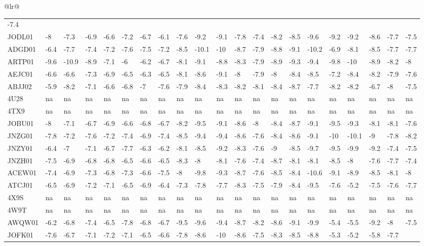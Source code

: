 \documentclass[12pt,twoside]{reedthesis}
\begin{document}
\begin{longtable}[c]{@{}lr@{}}
\begin{longtable}[]{@{}lllllllllllllllllllll@{}}
  -7.4\tabularnewline
  JODL01 & -8 & -7.3 & -6.9 & -6.6 & -7.2 & -6.7 & -6.1 & -7.6 & -9.2 &
  -9.1 & -7.8 & -7.4 & -8.2 & -8.5 & -9.6 & -9.2 & -9.2 & -8.6 & -7.7 &
  -7.5\tabularnewline
  ADGD01 & -6.4 & -7.7 & -7.4 & -7.2 & -7.6 & -7.5 & -7.2 & -8.5 & -10.1 &
  -10 & -8.7 & -7.9 & -8.8 & -9.1 & -10.2 & -6.9 & -8.1 & -8.5 & -7.7 &
  -7.7\tabularnewline
  ARTP01 & -9.6 & -10.9 & -8.9 & -7.1 & -6 & -6.2 & -6.7 & -8.1 & -9.1 &
  -8.8 & -8.3 & -7.9 & -8.9 & -9.3 & -9.4 & -9.8 & -10 & -8.9 & -8.2 &
  -8\tabularnewline
  AEJC01 & -6.6 & -6.6 & -7.3 & -6.9 & -6.5 & -6.3 & -6.5 & -8.1 & -8.6 &
  -9.1 & -8 & -7.9 & -8 & -8.4 & -8.5 & -7.2 & -8.4 & -8.2 & -7.9 &
  -7.6\tabularnewline
  ABJJ02 & -5.9 & -8.2 & -7.1 & -6.6 & -6.8 & -7 & -7.6 & -7.9 & -8.4 &
  -8.3 & -8.2 & -8.1 & -8.4 & -8.7 & -7.7 & -8.2 & -8.2 & -6.7 & -8 &
  -7.5\tabularnewline
  4U28 & na & na & na & na & na & na & na & na & na & na & na & na & na &
  na & na & na & na & na & na & na\tabularnewline
  4TX9 & na & na & na & na & na & na & na & na & na & na & na & na & na &
  na & na & na & na & na & na & na\tabularnewline
  JOBU01 & -8 & -7.1 & -6.7 & -6.9 & -6.6 & -6.8 & -6.7 & -8.2 & -9.5 &
  -9.1 & -8.6 & -8 & -8.4 & -8.7 & -9.1 & -9.5 & -9.3 & -8.1 & -8.1 &
  -7.6\tabularnewline
  JNZG01 & -7.8 & -7.2 & -7.6 & -7.2 & -7.4 & -6.9 & -7.4 & -8.5 & -9.4 &
  -9.4 & -8.6 & -7.6 & -8.4 & -8.6 & -9.1 & -10 & -10.1 & -9 & -7.8 &
  -8.2\tabularnewline
  JNZY01 & -6.4 & -7 & -7.1 & -6.7 & -7.7 & -6.3 & -6.2 & -8.1 & -8.5 &
  -9.2 & -8.3 & -7.6 & -9 & -8.5 & -9.7 & -9.5 & -9.9 & -9.2 & -7.4 &
  -7.5\tabularnewline
  JNZH01 & -7.5 & -6.9 & -6.8 & -6.8 & -6.5 & -6.6 & -6.5 & -8.3 & -8 &
  -8.1 & -7.6 & -7.4 & -8.7 & -8.1 & -8.1 & -8.5 & -8 & -7.6 & -7.7 &
  -7.4\tabularnewline
  ACEW01 & -7.4 & -6.9 & -7.3 & -6.8 & -7.3 & -6.6 & -7.5 & -8 & -9.8 &
  -9.3 & -8.7 & -7.6 & -8.5 & -8.4 & -10.6 & -9.1 & -8.9 & -8.5 & -8.1 &
  -8\tabularnewline
  ATCJ01 & -6.5 & -6.9 & -7.2 & -7.1 & -6.5 & -6.9 & -6.4 & -7.3 & -7.8 &
  -7.7 & -8.3 & -7.5 & -7.9 & -8.4 & -9.5 & -7.6 & -5.2 & -7.5 & -7.6 &
  -7.7\tabularnewline
  4X9S & na & na & na & na & na & na & na & na & na & na & na & na & na &
  na & na & na & na & na & na & na\tabularnewline
  4W9T & na & na & na & na & na & na & na & na & na & na & na & na & na &
  na & na & na & na & na & na & na\tabularnewline
  AWQW01 & -6.2 & -6.8 & -7.4 & -6.5 & -7.8 & -6.8 & -6.7 & -9.5 & -9.6 &
  -9.4 & -8.7 & -8.2 & -8.6 & -9.1 & -9.9 & -5.4 & -5.5 & -9.2 & -8 &
  -7.5\tabularnewline
  JOFK01 & -7.6 & -6.7 & -7.1 & -7.2 & -7.1 & -6.5 & -6.6 & -7.8 & -8.6 &
  -10 & -8.6 & -7.5 & -8.3 & -8.5 & -8.8 & -5.3 & -5.2 & -5.8 & -7.7 &

\end{longtable}
\end{longtable}
\end{document}
